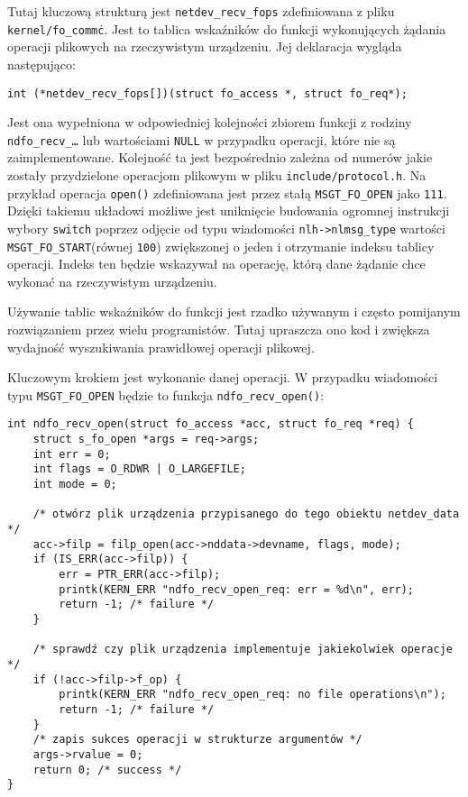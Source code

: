 \documentclass[10pt]{article}
\begin{document}
Tutaj kluczową strukturą jest \texttt{netdev\_recv\_fops} zdefiniowana z pliku \texttt{kernel/fo\_comm\.c}. Jest to tablica wskaźników do funkcji wykonujących żądania operacji plikowych na rzeczywistym urządzeniu. Jej deklaracja wygląda następująco:

\begin{verbatim}
int (*netdev_recv_fops[])(struct fo_access *, struct fo_req*);
\end{verbatim}

Jest ona wypełniona w odpowiedniej kolejności zbiorem funkcji z rodziny \texttt{ndfo\_recv\_\ldots} lub wartościami \texttt{NULL} w przypadku operacji, które nie są zaimplementowane. Kolejność ta jest bezpośrednio zależna od numerów jakie zostały przydzielone operacjom plikowym w pliku \texttt{include/protocol.h}. Na przykład operacja \texttt{open()} zdefiniowana jest przez stałą \texttt{MSGT\_FO\_OPEN} jako \texttt{111}.  Dzięki takiemu układowi możliwe jest uniknięcie budowania ogromnej instrukcji wybory \texttt{switch} poprzez odjęcie od typu wiadomości \texttt{nlh-\textgreater{}nlmsg\_type} wartości \texttt{MSGT\_FO\_START}(równej \texttt{100}) zwiększonej o jeden i otrzymanie indeksu tablicy operacji. Indeks ten będzie wskazywał na operację, którą dane żądanie chce wykonać na rzeczywistym urządzeniu.

Używanie tablic wskaźników do funkcji jest rzadko używanym i często pomijanym rozwiązaniem przez wielu programistów. Tutaj upraszcza ono kod i zwiększa wydajność wyszukiwania prawidłowej operacji plikowej.

Kluczowym krokiem jest wykonanie danej operacji. W przypadku wiadomości typu \texttt{MSGT\_FO\_OPEN} będzie to funkcja \texttt{ndfo\_recv\_open()}:

\newpage
\begin{verbatim}
int ndfo_recv_open(struct fo_access *acc, struct fo_req *req) {
    struct s_fo_open *args = req->args;
    int err = 0;
    int flags = O_RDWR | O_LARGEFILE;
    int mode = 0;

    /* otwórz plik urządzenia przypisanego do tego obiektu netdev_data */
    acc->filp = filp_open(acc->nddata->devname, flags, mode);
    if (IS_ERR(acc->filp)) {
        err = PTR_ERR(acc->filp);
        printk(KERN_ERR "ndfo_recv_open_req: err = %d\n", err);
        return -1; /* failure */
    }

    /* sprawdź czy plik urządzenia implementuje jakiekolwiek operacje */
    if (!acc->filp->f_op) {
        printk(KERN_ERR "ndfo_recv_open_req: no file operations\n");
        return -1; /* failure */
    }
    /* zapis sukces operacji w strukturze argumentów */
    args->rvalue = 0;
    return 0; /* success */
}
\end{verbatim}
\end{document}
